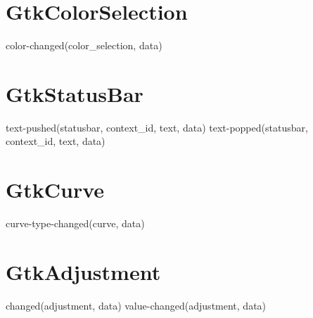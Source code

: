 	\section{GtkColorSelection}
	color-changed(color_selection, data)

	\section{GtkStatusBar}
	text-pushed(statusbar, context_id, text, data)
	text-popped(statusbar, context_id, text, data)
	\section{GtkCurve}
	curve-type-changed(curve, data)
	\section{GtkAdjustment}
	changed(adjustment, data)
	value-changed(adjustment, data)
